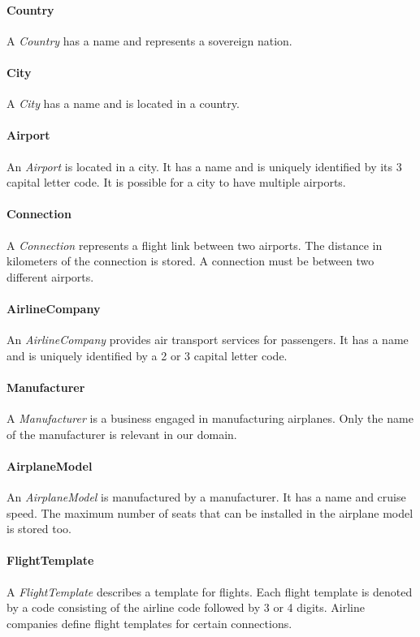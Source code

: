 \documentclass[a4paper]{article}
\newcommand{\field}[1]{\emph{#1}}
\begin{document}
\paragraph{Country}
A \field{Country} has a name and represents a sovereign nation.
\paragraph{City}
A \field{City} has a name and is located in a country.
\paragraph{Airport}
An \field{Airport} is located in a city.
It has a name and is uniquely identified by its 3 capital letter code.
It is possible for a city to have multiple airports.
\paragraph{Connection}
A \field{Connection} represents a flight link between two airports.
The distance in kilometers of the connection is stored.
A connection must be between two different airports.
\paragraph{AirlineCompany}
An \field{AirlineCompany} provides air transport services for passengers.
It has a name and is uniquely identified by a 2 or 3 capital letter code.
\paragraph{Manufacturer}
A \field{Manufacturer} is a business engaged in manufacturing airplanes.
Only the name of the manufacturer is relevant in our domain.
\paragraph{AirplaneModel}
An \field{AirplaneModel} is manufactured by a manufacturer.
It has a name and cruise speed.
The maximum number of seats that can be installed in the airplane model is stored too.
\paragraph{FlightTemplate}
A \field{FlightTemplate} describes a template for flights.
Each flight template is denoted by a code consisting of the airline code followed by 3 or 4 digits.
Airline companies define flight templates for certain connections.
\end{document}
